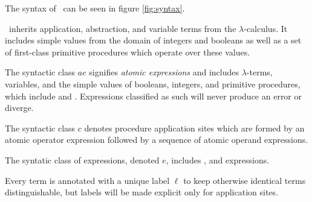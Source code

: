 \documentclass{sigplanconf}
\begin{document}
The syntax of \chapcalc\ can be seen in figure \ref{fig:syntax}.

\chapcalc\ inherits application, abstraction, and variable terms from the $\lambda$-calculus.
It includes simple values from the domain of integers and booleans as well as a set of first-class primitive procedures which operate over these values.

The syntactic class $\mathit{ae}$ signifies \emph{atomic expressions} and includes $\lambda$-terms, variables, and the simple values of booleans, integers, and primitive procedures, which include  and .
Expressions classified as such will never produce an error or diverge.

The syntactic class $c$ denotes procedure application sites which are formed by an atomic operator expression followed by a sequence of atomic operand expressions.

The syntatic class of expressions, denoted $e$, includes , and  expressions.

Every term is annotated with a unique label $\ell$ to keep otherwise identical terms distinguishable, but labels will be made explicit only for application sites.

\newcommand{\vx}[0]{\mathbf{x}}

\newcommand{\appe}[2]{(#1\,#2)^\ell}
\newcommand{\lame}[2]{(\lambda\,(#1)\,#2)}
\newcommand{\chae}[2]{(\mathit{chaperone\mhyphen operator}\,#1\,#2)^\ell}
\newcommand{\impe}[2]{(\mathit{impersonate\mhyphen operator}\,#1\,#2)}
\newcommand{\lete}[3]{(\mathbf{let}\,((#1)\,#2)\,#3)}
\newcommand{\ife}[3]{(\mathbf{if}\,#1\,#2\,#3)}

\newcommand{\true}[0]{\mathrm{\#t}}
\newcommand{\false}[0]{\mathrm{\#f}}

\newcommand{\stxclass}[4]{$#1\in\mathbf{#2}$ &::=& #3 & #4}
\newcommand{\stxclasscont}[2]{&$|$& #1 & #2}
\end{document}

